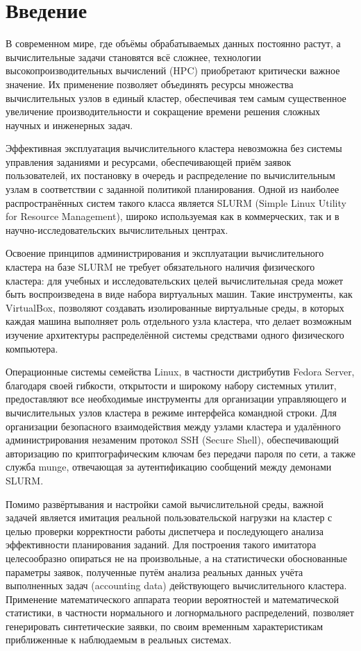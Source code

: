\newpage
\section*{Введение}

В современном мире, где объёмы обрабатываемых данных постоянно
растут, а вычислительные задачи становятся всё сложнее, технологии
высокопроизводительных вычислений (HPC) приобретают критически
важное значение. Их применение позволяет объединять ресурсы
множества вычислительных узлов в единый кластер, обеспечивая тем
самым существенное увеличение производительности и сокращение
времени решения сложных научных и инженерных задач.

Эффективная эксплуатация вычислительного кластера невозможна без
системы управления заданиями и ресурсами, обеспечивающей приём
заявок пользователей, их постановку в очередь и распределение по
вычислительным узлам в соответствии с заданной политикой
планирования. Одной из наиболее распространённых систем такого
класса является SLURM (Simple Linux Utility for Resource
Management), широко используемая как в коммерческих, так и в
научно-исследовательских вычислительных центрах.

Освоение принципов администрирования и эксплуатации
вычислительного кластера на базе SLURM не требует обязательного
наличия физического кластера: для учебных и исследовательских
целей вычислительная среда может быть воспроизведена в виде набора
виртуальных машин. Такие инструменты, как VirtualBox, позволяют
создавать изолированные виртуальные среды, в которых каждая
машина выполняет роль отдельного узла кластера, что делает
возможным изучение архитектуры распределённой системы средствами
одного физического компьютера.

Операционные системы семейства Linux, в частности дистрибутив
Fedora Server, благодаря своей гибкости, открытости и широкому
набору системных утилит, предоставляют все необходимые
инструменты для организации управляющего и вычислительных узлов
кластера в режиме интерфейса командной строки. Для организации
безопасного взаимодействия между узлами кластера и удалённого
администрирования незаменим протокол SSH (Secure Shell),
обеспечивающий авторизацию по криптографическим ключам без
передачи пароля по сети, а также служба munge, отвечающая за
аутентификацию сообщений между демонами SLURM.

Помимо развёртывания и настройки самой вычислительной среды,
важной задачей является имитация реальной пользовательской
нагрузки на кластер с целью проверки корректности работы
диспетчера и последующего анализа эффективности планирования
заданий. Для построения такого имитатора целесообразно опираться
не на произвольные, а на статистически обоснованные параметры
заявок, полученные путём анализа реальных данных учёта
выполненных задач (accounting data) действующего вычислительного
кластера. Применение математического аппарата теории вероятностей
и математической статистики, в частности нормального и
логнормального распределений, позволяет генерировать синтетические
заявки, по своим временным характеристикам приближенные к
наблюдаемым в реальных системах.

